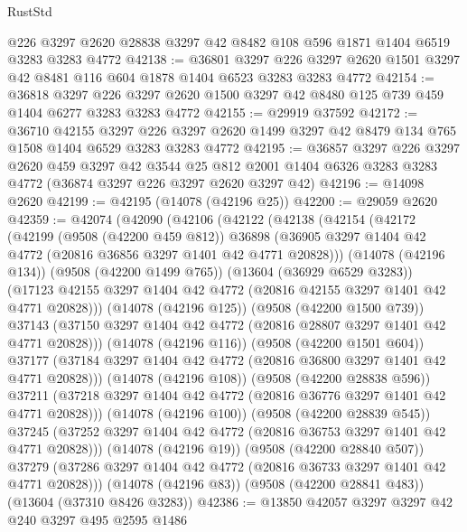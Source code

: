 \begin{lexlean}{RustStd}
\begin{coremodule}
    @226
    @3297
    @2620
    @28838
    @3297
    @42
    @8482
    @108
    @596
    @1871
    @1404
    @6519
    @3283
    @3283
    @4772
@42138 := @36801
    @3297
    @226
    @3297
    @2620
    @1501
    @3297
    @42
    @8481
    @116
    @604
    @1878
    @1404
    @6523
    @3283
    @3283
    @4772
@42154 := @36818
    @3297
    @226
    @3297
    @2620
    @1500
    @3297
    @42
    @8480
    @125
    @739
    @459
    @1404
    @6277
    @3283
    @3283
    @4772
@42155 := @29919 @37592
@42172 := @36710
    @42155
    @3297
    @226
    @3297
    @2620
    @1499
    @3297
    @42
    @8479
    @134
    @765
    @1508
    @1404
    @6529
    @3283
    @3283
    @4772
@42195 := @36857
    @3297
    @226
    @3297
    @2620
    @459
    @3297
    @42
    @3544
    @25
    @812
    @2001
    @1404
    @6326
    @3283
    @3283
    @4772
    (@36874 @3297 @226 @3297 @2620 @3297 @42)
@42196 := @14098 @2620
@42199 := @42195 (@14078 (@42196 @25))
@42200 := @29059 @2620
@42359 := @42074
    (@42090
      (@42106
        (@42122
          (@42138
            (@42154
              (@42172
                (@42199
                  (@9508 (@42200 @459 @812))
                  @36898
                  (@36905 @3297 @1404 @42 @4772 (@20816 @36856 @3297 @1401 @42 @4771 @20828)))
                (@14078 (@42196 @134))
                (@9508 (@42200 @1499 @765))
                (@13604 (@36929 @6529 @3283))
                (@17123 @42155 @3297 @1404 @42 @4772 (@20816 @42155 @3297 @1401 @42 @4771 @20828)))
              (@14078 (@42196 @125))
              (@9508 (@42200 @1500 @739))
              @37143
              (@37150 @3297 @1404 @42 @4772 (@20816 @28807 @3297 @1401 @42 @4771 @20828)))
            (@14078 (@42196 @116))
            (@9508 (@42200 @1501 @604))
            @37177
            (@37184 @3297 @1404 @42 @4772 (@20816 @36800 @3297 @1401 @42 @4771 @20828)))
          (@14078 (@42196 @108))
          (@9508 (@42200 @28838 @596))
          @37211
          (@37218 @3297 @1404 @42 @4772 (@20816 @36776 @3297 @1401 @42 @4771 @20828)))
        (@14078 (@42196 @100))
        (@9508 (@42200 @28839 @545))
        @37245
        (@37252 @3297 @1404 @42 @4772 (@20816 @36753 @3297 @1401 @42 @4771 @20828)))
      (@14078 (@42196 @19))
      (@9508 (@42200 @28840 @507))
      @37279
      (@37286 @3297 @1404 @42 @4772 (@20816 @36733 @3297 @1401 @42 @4771 @20828)))
    (@14078 (@42196 @83))
    (@9508 (@42200 @28841 @483))
    (@13604 (@37310 @8426 @3283))
@42386 := @13850
    @42057
    @3297
    @3297
    @42
    @240
    @3297
    @495
    @2595
    @1486

\end{coremodule}
\end{lexlean}
